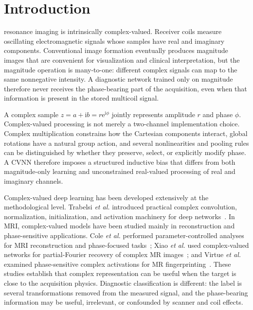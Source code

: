 \section{Introduction}\label{sec:introduction}
 resonance imaging is intrinsically complex-valued. Receiver coils measure oscillating electromagnetic signals whose samples have real and imaginary components. Conventional image formation eventually produces magnitude images that are convenient for visualization and clinical interpretation, but the magnitude operation is many-to-one: different complex signals can map to the same nonnegative intensity. A diagnostic network trained only on magnitude therefore never receives the phase-bearing part of the acquisition, even when that information is present in the stored multicoil signal.

A complex sample $z=a+\mathrm{i}b=r\mathrm{e}^{\mathrm{i}\phi}$ jointly represents amplitude $r$ and phase $\phi$. Complex-valued processing is not merely a two-channel implementation choice. Complex multiplication constrains how the Cartesian components interact, global rotations have a natural group action, and several nonlinearities and pooling rules can be distinguished by whether they preserve, select, or explicitly modify phase. A \ac{CVNN} therefore imposes a structured inductive bias that differs from both magnitude-only learning and unconstrained real-valued processing of real and imaginary channels.

Complex-valued deep learning has been developed extensively at the methodological level. Trabelsi \emph{et al.} introduced practical complex convolution, normalization, initialization, and activation machinery for deep networks~\cite{Trabelsi2018DeepComplex}. In MRI, complex-valued models have been studied mainly in reconstruction and phase-sensitive applications. Cole \emph{et al.} performed parameter-controlled analyses for MRI reconstruction and phase-focused tasks~\cite{Cole2021ComplexMRI}; Xiao \emph{et al.} used complex-valued networks for partial-Fourier recovery of complex MR images~\cite{Xiao2022ComplexPartialFourier}; and Virtue \emph{et al.} examined phase-sensitive complex activations for MR fingerprinting~\cite{Virtue2017ComplexActivation}. These studies establish that complex representation can be useful when the target is close to the acquisition physics. Diagnostic classification is different: the label is several transformations removed from the measured signal, and the phase-bearing information may be useful, irrelevant, or confounded by scanner and coil effects.

